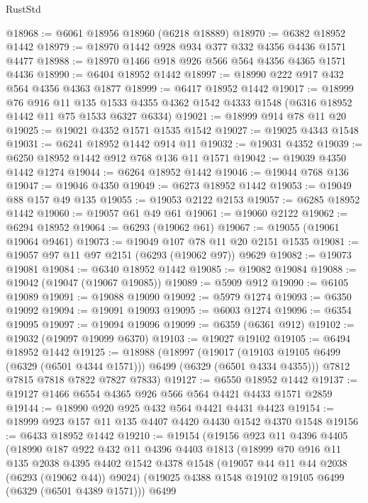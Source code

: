 \begin{lexlean}{RustStd}
\begin{coremodule}
{{@18968 := @6061 @18956 @18960 (@6218 @18889)
@18970 := @6382 @18952 @1442
@18979 := @18970 @1442 @928 @934 @377 @332 @4356 @4436 @1571 @4477
@18988 := @18970 @1466 @918 @926 @566 @564 @4356 @4365 @1571 @4436
@18990 := @6404 @18952 @1442
@18997 := @18990 @222 @917 @432 @564 @4356 @4363 @1877
@18999 := @6417 @18952 @1442
@19017 := @18999
    @76
    @916
    @11
    @135
    @1533
    @4355
    @4362
    @1542
    @4333
    @1548
    (@6316 @18952 @1442 @11 @75 @1533 @6327 @6334)
@19021 := @18999 @914 @78 @11 @20
@19025 := @19021 @4352 @1571 @1535 @1542
@19027 := @19025 @4343 @1548
@19031 := @6241 @18952 @1442 @914 @11
@19032 := @19031 @4352
@19039 := @6250 @18952 @1442 @912 @768 @136 @11 @1571
@19042 := @19039 @4350 @1442 @1274
@19044 := @6264 @18952 @1442
@19046 := @19044 @768 @136
@19047 := @19046 @4350
@19049 := @6273 @18952 @1442
@19053 := @19049 @88 @157 @49 @135
@19055 := @19053 @2122 @2153
@19057 := @6285 @18952 @1442
@19060 := @19057 @61 @49 @61
@19061 := @19060 @2122
@19062 := @6294 @18952
@19064 := @6293 (@19062 @61)
@19067 := @19055 (@19061 @19064 @9461)
@19073 := @19049 @107 @78 @11 @20 @2151 @1535
@19081 := @19057 @97 @11 @97 @2151 (@6293 (@19062 @97)) @9629
@19082 := @19073 @19081
@19084 := @6340 @18952 @1442
@19085 := @19082 @19084
@19088 := @19042 (@19047 (@19067 @19085))
@19089 := @5909 @912
@19090 := @6105 @19089
@19091 := @19088 @19090
@19092 := @5979 @1274
@19093 := @6350 @19092
@19094 := @19091 @19093
@19095 := @6003 @1274
@19096 := @6354 @19095
@19097 := @19094 @19096
@19099 := @6359 (@6361 @912)
@19102 := @19032 (@19097 @19099 @6370)
@19103 := @19027 @19102
@19105 := @6494 @18952 @1442
@19125 := @18988
    (@18997
      (@19017 (@19103 @19105 @6499 (@6329 (@6501 @4344 @1571))) @6499 (@6329 (@6501 @4334 @4355)))
      @7812
      @7815
      @7818
      @7822
      @7827
      @7833)
@19127 := @6550 @18952 @1442
@19137 := @19127 @1466 @6554 @4365 @926 @566 @564 @4421 @4433 @1571 @2859
@19144 := @18990 @920 @925 @432 @564 @4421 @4431 @4423
@19154 := @18999 @923 @157 @11 @135 @4407 @4420 @4430 @1542 @4370 @1548
@19156 := @6433 @18952 @1442
@19210 := @19154
    (@19156
      @923
      @11
      @4396
      @4405
      (@18990
        @187
        @922
        @432
        @11
        @4396
        @4403
        @1813
        (@18999
          @70
          @916
          @11
          @135
          @2038
          @4395
          @4402
          @1542
          @4378
          @1548
          (@19057 @44 @11 @44 @2038 (@6293 (@19062 @44)) @9024)
          (@19025 @4388 @1548 @19102 @19105 @6499 (@6329 (@6501 @4389 @1571)))
          @6499
}}
\end{coremodule}
\end{lexlean}
